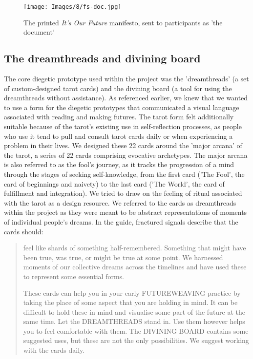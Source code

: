 \begin{figure}
    \centering
       \texttt{[image: Images/8/fs-doc.jpg]}
    \caption{The printed \emph{It's Our Future} manifesto, sent to participants as 'the document'}
    \label{fig:fs-document}
\end{figure}

\subsection{The dreamthreads and divining board}
\label{subsedc:8-4-2-dreamthreads}
The core diegetic prototype used within the project was the 'dreamthreads' (a set of custom-designed tarot cards) and the divining board (a tool for using the dreamthreads without assistance). As referenced earlier, we knew that we wanted to use a form for the diegetic prototypes that communicated a visual language associated with reading and making futures. The tarot form felt additionally suitable because of the tarot's existing use in self-reflection processes, as people who use it tend to pull and consult tarot cards daily or when experiencing a problem in their lives. We designed these 22 cards around the 'major arcana' of the tarot, a series of 22 cards comprising evocative archetypes. The major arcana is also referred to as the fool's journey, as it tracks the progression of a mind through the stages of seeking self-knowledge, from the first card ('The Fool', the card of beginnings and naivety) to the last card ('The World', the card of fulfillment and integration).  We tried to draw on the feeling of ritual associated with the tarot as a design resource. We referred to the cards as dreamthreads within the project as they were meant to be abstract representations of moments of individual people's dreams. In the guide, fractured signals describe that the cards should:
\begin{quote}
feel like shards of something half-remembered. Something that might have been true, was true, or might be true at some point. We harnessed moments of our collective dreams across the timelines and have used these to represent some essential forms. 

These cards can help you in your early FUTUREWEAVING practice by taking the place of some aspect that you are holding in mind. It can be difficult to hold these in mind and visualise some part of the future at the same time. Let the DREAMTHREADS stand in. Use them however helps you to feel comfortable with them. The DIVINING BOARD contains some suggested uses, but these are not the only possibilities. We suggest working with the cards daily.    
\end{quote}
